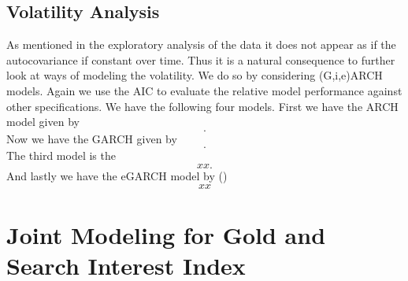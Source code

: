\documentclass[a4paper]{article}
\theoremstyle{definition}
\begin{document}
\subsection{Volatility Analysis}
As mentioned in the exploratory analysis of the data it does not appear as if the autocovariance if constant over time. Thus it is a natural consequence to further look at ways of modeling the volatility. We do so by considering (G,i,e)ARCH models. Again we use the AIC to evaluate the relative model performance against other specifications. We have the following four models. First we have the ARCH model given by
	\begin{equation}\tag{ARCH}
	.	
	\end{equation}
Now we have the GARCH given by
	\begin{equation}\tag{GARCH}
	.	
	\end{equation}
The third model is the 
	\begin{equation}\tag{iGARCH}
	xx.	
	\end{equation}
And lastly we have the eGARCH model by \citeauthor{Nelson.1991} (\citeyear{Nelson.1991})
	\begin{equation}\tag{eGARCH}
	xx	
	\end{equation}		
\newpage
\section{Joint Modeling for Gold and Search Interest Index}
\end{document}
